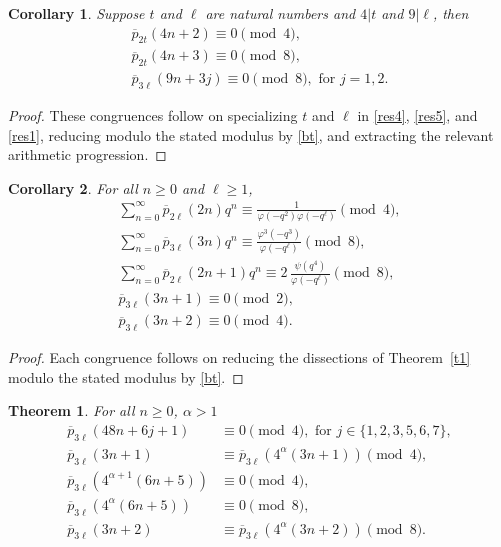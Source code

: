 \documentclass[11pt, reqno]{amsart}
\newtheorem{theorem}{Theorem}[section]
\newtheorem{corollary}{Corollary}[section]
\numberwithin{equation}{section}
\begin{document}
	\begin{corollary}\label{c1} Suppose $t$ and $\ell$ are natural numbers and $4|t$ and $9|\ell$, then
		\begin{align}
			\overline{p}_{2t}(4n+2)\equiv 0\pmod{4},\label{cor1}\\
			\overline{p}_{2t}(4n+3)\equiv 0\pmod{8},\label{cor2}\\
			\overline{p}_{3\ell}(9n+3j)\equiv 0\pmod{8}, \,\,\text{for}\,\,j=1,2.\label{cor3}
		\end{align}
	\end{corollary}
	\begin{proof}
		These congruences follow on specializing $t$ and $\ell$ in \eqref{res4}, \eqref{res5}, and \eqref{res1}, reducing modulo the stated modulus by \eqref{bt}, and extracting the relevant arithmetic progression.
	\end{proof}
	\begin{corollary}\label{c2} For all $n\geq0$ and $\ell\geq1$,
		\begin{align}
			\sum_{n=0}^{\infty}\overline{p}_{2\ell}(2n)q^n\equiv \frac{1}{\varphi(-q^2)\varphi(-q^\ell)}\pmod{4},\label{res6}\\
			\sum_{n=0}^{\infty}\overline{p}_{3\ell}(3n)q^n\equiv
			\frac{\varphi^3(-q^3)}{\varphi(-q^\ell)}\pmod{8},\label{res8}\\
			\sum_{n=0}^{\infty}\overline{p}_{2\ell}(2n+1)q^n\equiv2\,\frac{\psi(q^4)}
			{\varphi(-q^\ell)}\pmod{8}, \label{res7}\\
			\overline{p}_{3\ell}(3n+1)\equiv 0 \pmod{2},\\
			\overline{p}_{3\ell}(3n+2)\equiv0 \pmod{4}.
		\end{align}
	\end{corollary}
	\begin{proof}
		Each congruence follows on reducing the dissections of Theorem~\ref{t1} modulo the stated modulus by \eqref{bt}.
	\end{proof}
	\begin{theorem} For all $n\geq0$, $\alpha>1$
		\begin{align}
			\overline{p}_{3\ell}(48n+6j+1)&\equiv0 \pmod{4},\,\, \text{for}\,\,j\in\{1,2,3,5,6,7\},\label{mares1}\\
			\overline{p}_{3\ell}(3n+1)&\equiv\overline{p}_{3\ell}(4^\alpha(3n+1))\pmod{4},\label{mares2}\\
			\overline{p}_{3\ell}(4^{\alpha+1}(6n+5))&\equiv0\pmod{4},\label{mares31}\\
			\overline{p}_{3\ell}(4^\alpha(6n+5))&\equiv0\pmod{8},\label{mares3}\\
			\overline{p}_{3\ell}(3n+2)&\equiv\overline{p}_{3\ell}(4^{\alpha}(3n+2))\pmod{8}.\label{mares4}
		\end{align}
	\end{theorem}
\end{document}
